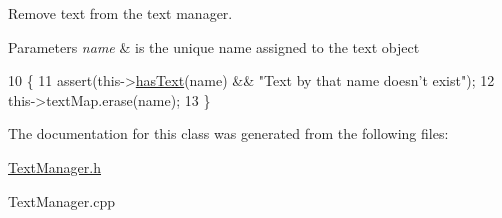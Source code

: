 Remove text from the text manager. 


\begin{DoxyParams}{Parameters}
{\em name} & is the unique name assigned to the text object \\
\hline
\end{DoxyParams}

\begin{DoxyCode}
10                                                   \{
11     assert(this->\hyperlink{class_text_manager_a3a68a4a9c574ca5a56990208fcf268ec}{hasText}(name) && \textcolor{stringliteral}{"Text by that name doesn't exist"});
12     this->textMap.erase(name);
13 \}
\end{DoxyCode}


The documentation for this class was generated from the following files\-:\begin{DoxyCompactItemize}
\item 
\hyperlink{_text_manager_8h}{Text\-Manager.\-h}\item 
Text\-Manager.\-cpp\end{DoxyCompactItemize}
